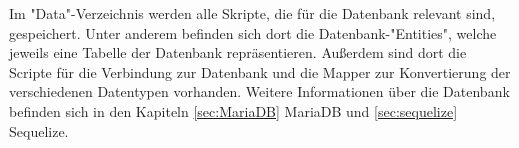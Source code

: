 
Im "Data"-Verzeichnis werden alle Skripte, die für die Datenbank relevant sind, gespeichert.
Unter anderem befinden sich dort die Datenbank-"Entities", welche jeweils eine Tabelle der Datenbank repräsentieren.
Außerdem sind dort die Scripte für die Verbindung zur Datenbank und die Mapper zur Konvertierung der verschiedenen Datentypen vorhanden. 
Weitere Informationen über die Datenbank befinden sich in den Kapiteln \ref{sec:MariaDB} MariaDB und \ref{sec:sequelize} Sequelize.